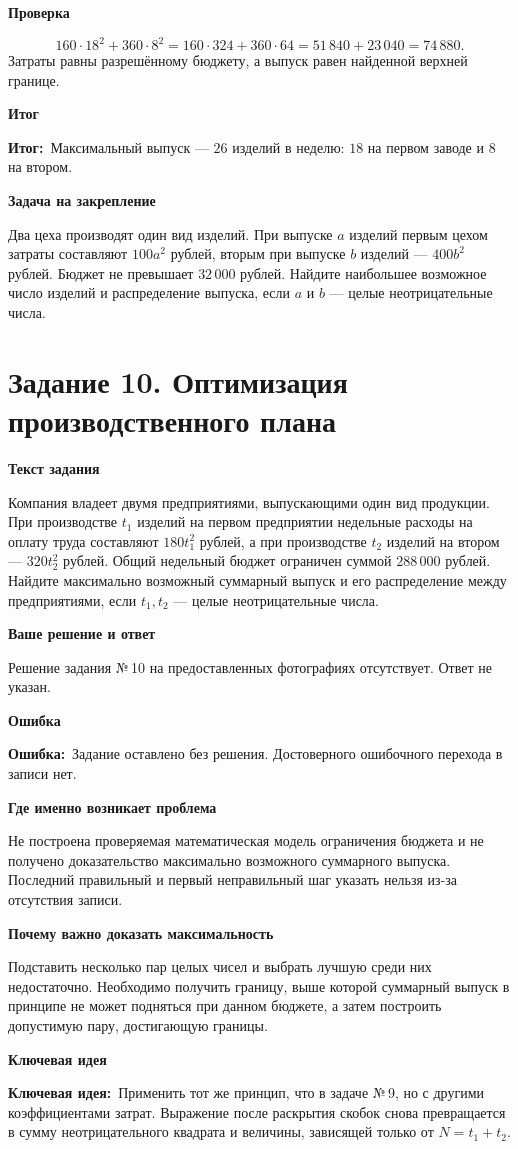 \documentclass[a4paper,12pt]{article}
\newcommand{\markerror}{\textcolor{errorred}{\textbf{Ошибка:}}}
\newcommand{\keyidea}{\textcolor{deep}{\textbf{Ключевая идея:}}}
\newcommand{\outcome}{\textcolor{accent}{\textbf{Итог:}}}
\newcommand{\sublabel}[1]{\par\vspace{0.35em}\noindent\textbf{#1}\par\vspace{0.05em}}
\begin{document}
\sublabel{Проверка}
\[
160\cdot18^2+360\cdot8^2
=160\cdot324+360\cdot64
=51\,840+23\,040=74\,880.
\]
Затраты равны разрешённому бюджету, а выпуск равен найденной верхней границе.

\sublabel{Итог}
\outcome\ Максимальный выпуск --- $\boxed{26}$ изделий в неделю: $\boxed{18}$ на первом заводе и $\boxed{8}$ на втором.

\sublabel{Задача на закрепление}
Два цеха производят один вид изделий. При выпуске $a$ изделий первым цехом затраты составляют $100a^2$ рублей, вторым при выпуске $b$ изделий --- $400b^2$ рублей. Бюджет не превышает $32\,000$ рублей. Найдите наибольшее возможное число изделий и распределение выпуска, если $a$ и $b$ --- целые неотрицательные числа.
\clearpage
{}\label{task:10}
\section*{Задание 10. Оптимизация производственного плана}
\sublabel{Текст задания}
Компания владеет двумя предприятиями, выпускающими один вид продукции. При производстве $t_1$ изделий на первом предприятии недельные расходы на оплату труда составляют $180t_1^2$ рублей, а при производстве $t_2$ изделий на втором --- $320t_2^2$ рублей. Общий недельный бюджет ограничен суммой $288\,000$ рублей. Найдите максимально возможный суммарный выпуск и его распределение между предприятиями, если $t_1,t_2$ --- целые неотрицательные числа.

\sublabel{Ваше решение и ответ}
Решение задания №\,10 на предоставленных фотографиях отсутствует. Ответ не указан.

\sublabel{Ошибка}
\markerror\ Задание оставлено без решения. Достоверного ошибочного перехода в записи нет.

\sublabel{Где именно возникает проблема}
Не построена проверяемая математическая модель ограничения бюджета и не получено доказательство максимально возможного суммарного выпуска. Последний правильный и первый неправильный шаг указать нельзя из-за отсутствия записи.

\sublabel{Почему важно доказать максимальность}
Подставить несколько пар целых чисел и выбрать лучшую среди них недостаточно. Необходимо получить границу, выше которой суммарный выпуск в принципе не может подняться при данном бюджете, а затем построить допустимую пару, достигающую границы.

\sublabel{Ключевая идея}
\keyidea\ Применить тот же принцип, что в задаче №\,9, но с другими коэффициентами затрат. Выражение после раскрытия скобок снова превращается в сумму неотрицательного квадрата и величины, зависящей только от $N=t_1+t_2$.
\end{document}
